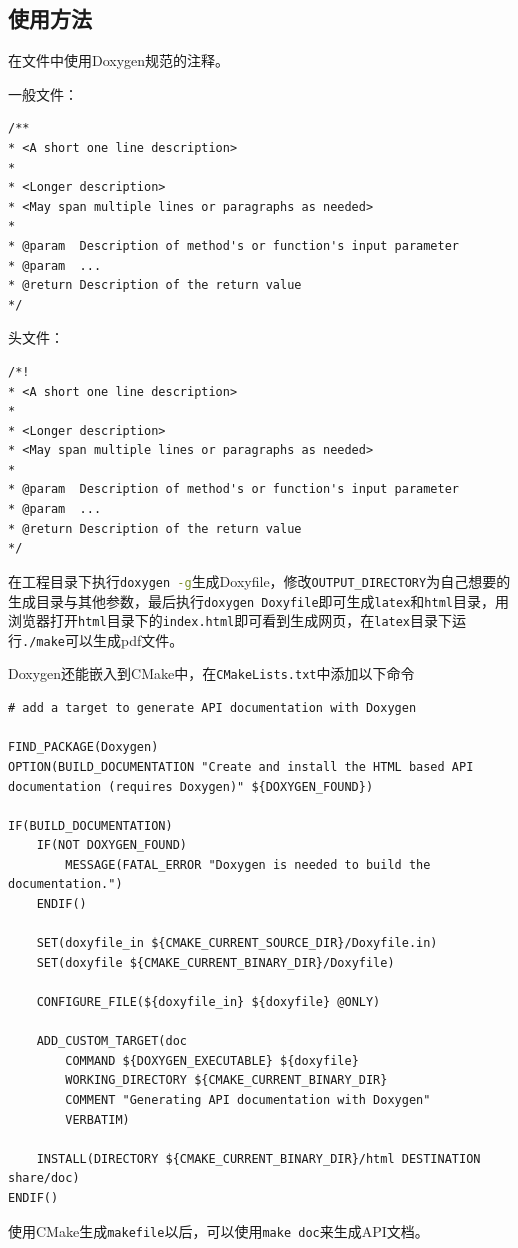 		\subsection{使用方法}
			\par 在文件中使用Doxygen规范的注释\cite{ wiki:Doxygen}。
			\par\noindent 一般文件：
			\begin{lstlisting}
/**
* <A short one line description>
*
* <Longer description>
* <May span multiple lines or paragraphs as needed>
*
* @param  Description of method's or function's input parameter
* @param  ...
* @return Description of the return value
*/
			\end{lstlisting}
			\par\noindent 头文件：
			\begin{lstlisting}
/*!
* <A short one line description>
*
* <Longer description>
* <May span multiple lines or paragraphs as needed>
*
* @param  Description of method's or function's input parameter
* @param  ...
* @return Description of the return value
*/
			\end{lstlisting}
			\par 在工程目录下执行\lstinline[language=sh]{doxygen -g}生成Doxyfile，修改\lstinline{OUTPUT_DIRECTORY}为自己想要的生成目录与其他参数，最后执行\lstinline{doxygen Doxyfile}即可生成\lstinline{latex}和\lstinline{html}目录，用浏览器打开\lstinline{html}目录下的\lstinline{index.html}即可看到生成网页，在\lstinline{latex}目录下运行\lstinline{./make}可以生成pdf文件。
			\par Doxygen还能嵌入到CMake中，在\lstinline{CMakeLists.txt}中添加以下命令
			\begin{lstlisting}
# add a target to generate API documentation with Doxygen

FIND_PACKAGE(Doxygen)
OPTION(BUILD_DOCUMENTATION "Create and install the HTML based API documentation (requires Doxygen)" ${DOXYGEN_FOUND})

IF(BUILD_DOCUMENTATION)
	IF(NOT DOXYGEN_FOUND)
		MESSAGE(FATAL_ERROR "Doxygen is needed to build the documentation.")
	ENDIF()

	SET(doxyfile_in ${CMAKE_CURRENT_SOURCE_DIR}/Doxyfile.in)
	SET(doxyfile ${CMAKE_CURRENT_BINARY_DIR}/Doxyfile)

	CONFIGURE_FILE(${doxyfile_in} ${doxyfile} @ONLY)

	ADD_CUSTOM_TARGET(doc
		COMMAND ${DOXYGEN_EXECUTABLE} ${doxyfile}
		WORKING_DIRECTORY ${CMAKE_CURRENT_BINARY_DIR}
		COMMENT "Generating API documentation with Doxygen"
		VERBATIM)

	INSTALL(DIRECTORY ${CMAKE_CURRENT_BINARY_DIR}/html DESTINATION share/doc)
ENDIF()
			\end{lstlisting}
			\par 使用CMake生成\lstinline{makefile}以后，可以使用\lstinline{make doc}来生成API文档。
